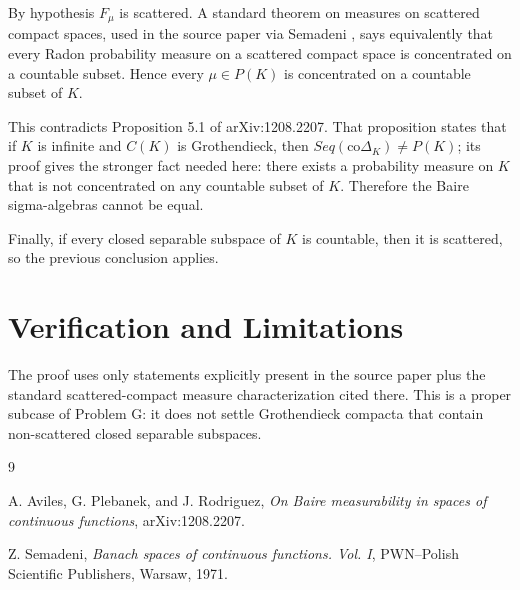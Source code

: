 \documentclass[11pt]{amsart}
\newcommand{\co}{\mathrm{co}}
\newcommand{\DeltaK}{\Delta_K}
\begin{document}
By hypothesis $F_\mu$ is scattered. A standard theorem on measures on
scattered compact spaces, used in the source paper via Semadeni
\cite[Theorem 19.7.6]{semadeni}, says equivalently that every Radon
probability measure on a scattered compact space is concentrated on a
countable subset. Hence every $\mu\in P(K)$ is concentrated on a countable
subset of $K$.

This contradicts Proposition 5.1 of arXiv:1208.2207. That proposition
states that if $K$ is infinite and $C(K)$ is Grothendieck, then
$Seq(\co\DeltaK)\ne P(K)$; its proof gives the stronger fact needed here:
there exists a probability measure on $K$ that is not concentrated on any
countable subset of $K$. Therefore the Baire sigma-algebras cannot be
equal.

Finally, if every closed separable subspace of $K$ is countable, then it
is scattered, so the previous conclusion applies.

\section*{Verification and Limitations}

The proof uses only statements explicitly present in the source paper plus
the standard scattered-compact measure characterization cited there. This
is a proper subcase of Problem G: it does not settle Grothendieck compacta
that contain non-scattered closed separable subspaces.

\begin{thebibliography}{9}

A. Aviles, G. Plebanek, and J. Rodriguez,
\emph{On Baire measurability in spaces of continuous functions},
arXiv:1208.2207.

Z. Semadeni,
\emph{Banach spaces of continuous functions. Vol. I},
PWN--Polish Scientific Publishers, Warsaw, 1971.

\end{thebibliography}
\end{document}
